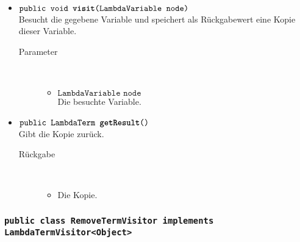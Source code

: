 \begin{description}
\begin{itemize}
		\item $\texttt{public void \textbf{visit}(LambdaVariable node)}$ \\ Besucht die gegebene Variable und speichert als Rückgabewert eine Kopie dieser Variable.
		\begin{description}
			\item[Parameter] \hfill \\
			\vspace{-.8cm}
			\begin{itemize}
				\item $\texttt{LambdaVariable node}$ \\ Die besuchte Variable.
			\end{itemize}
		\end{description}
		
		\item $\texttt{public LambdaTerm \textbf{getResult}()}$ \\ Gibt die Kopie zurück.
		\begin{description}
			\item[Rückgabe] \hfill \\
			\vspace{-.8cm}
			\begin{itemize}
				\item Die Kopie.
			\end{itemize}
		\end{description}
	\end{itemize}
\end{description}

\subsubsection{\normalfont \texttt{public class \textbf{RemoveTermVisitor} implements LambdaTermVisitor<Object>}}

